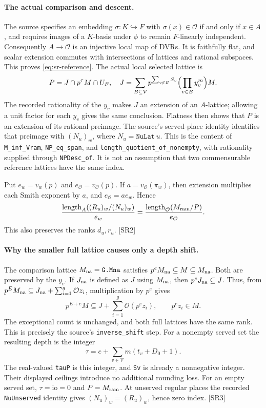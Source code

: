 \documentclass[11pt,a4paper]{article}
\numberwithin{equation}{section}
\theoremstyle{remark}\newtheorem{remark}[theorem]{Remark}
\begin{document}
\paragraph{The actual comparison and descent.}
The source specifies an embedding $\sigma:K\hookrightarrow F$ with
$\sigma(x)\in\mathcal O$ if and only if $x\in A$, and requires images
of a $K$-basis under $\phi$ to remain $F$-linearly independent.
Consequently $A\to\mathcal O$ is an injective local map of DVRs.
It is faithfully flat, and scalar extension commutes with intersections
of lattices and rational subspaces. This proves \eqref{eq:sr-reference}.
The actual local selected lattice is
\[
 P=J\cap p^\tau M\cap U_F,
 \quad
 J=\sum_{B\subseteq\mathcal V}
 p^{\sum_{v\notin B}S_v}\Bigl(\prod_{v\in B}y_v^m\Bigr)M.
\]
The recorded rationality of the $y_v$ makes $J$ an extension of an
$A$-lattice; allowing a unit factor for each $y_v$ gives the same conclusion.
Flatness then shows that $P$ is an extension of its rational preimage.
The source's served-place identity identifies that preimage with
$(N_u)_w$, where $N_u=\texttt{NuLat}\,u$.
This is the content of \texttt{M\_inf\_Vram}, \texttt{NP\_eq\_span}, and
\texttt{length\_quotient\_of\_nonempty}, with rationality supplied through
\texttt{NPDesc\_of}. It is not an assumption that two commensurable
reference lattices have the same index.

Put $e_w=v_w(p)$ and $e_{\mathcal O}=v_{\mathcal O}(p)$.
If $a=v_{\mathcal O}(\pi_w)$, then extension multiplies each Smith
exponent by $a$, and $e_{\mathcal O}=ae_w$. Hence
\begin{equation}\label{eq:sr-length-transport}
 \frac{\operatorname{length}_{A}((R_u)_w/(N_u)_w)}{e_w}
 =\frac{\operatorname{length}_{\mathcal O}(M_{\rm ram}/P)}{e_{\mathcal O}}.
\end{equation}
This also preserves the ranks $d_u,r_u$. \textsf{[SR2]}

\paragraph{Why the smaller full lattice causes only a depth shift.}
The comparison lattice $M_{\rm na}=\texttt{G.Mna}$ satisfies
$p^eM_{\rm na}\subseteq M\subseteq M_{\rm na}$.
Both are preserved by the $y_v$. If $J_{\rm na}$ is defined as $J$ using
$M_{\rm na}$, then $p^eJ_{\rm na}\subseteq J$.
Thus, from
$p^EM_{\rm na}\subseteq J_{\rm na}+\sum_{i=1}^g\mathcal O z_i$,
multiplication by $p^e$ gives
\[
 p^{E+e}M\subseteq J+\sum_{i=1}^g\mathcal O(p^ez_i),
 \qquad p^ez_i\in M.
\]
The exceptional count is unchanged, and both full lattices have the same
rank. This is precisely the source's \texttt{inverse\_shift} step.
For a nonempty served set the resulting depth is the integer
\[
 \tau=e+\sum_{v\in\mathcal V}m(t_v+D_0+1).
\]
The real-valued \texttt{tauP} is this integer, and \texttt{Sv} is already
a nonnegative integer. Their displayed ceilings introduce no additional
rounding loss. For an empty served set, $\tau=\mathrm{io}=0$ and
$P=M_{\rm ram}$. At unserved regular places the recorded
\texttt{NuUnserved} identity gives $(N_u)_w=(R_u)_w$, hence zero index.
\textsf{[SR3]}
\end{document}
